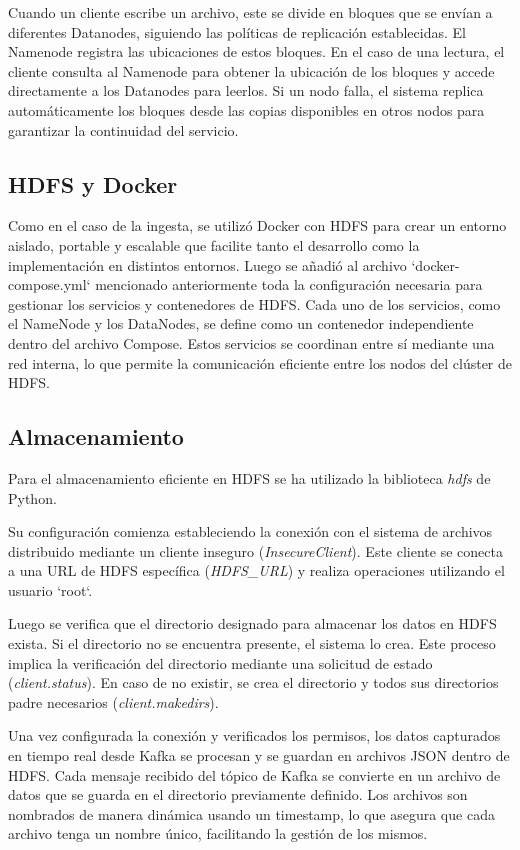 \documentclass{article}
\begin{document}
Cuando un cliente escribe un archivo, este se divide en bloques que se envían a diferentes Datanodes, siguiendo las políticas de replicación establecidas. El Namenode registra las ubicaciones de estos bloques. En el caso de una lectura, el cliente consulta al Namenode para obtener la ubicación de los bloques y accede directamente a los Datanodes para leerlos. Si un nodo falla, el sistema replica automáticamente los bloques desde las copias disponibles en otros nodos para garantizar la continuidad del servicio.

\subsection{HDFS y Docker}

Como en el caso de la ingesta, se utilizó Docker con HDFS para crear un entorno aislado, portable y escalable que facilite tanto el desarrollo como la implementación en distintos entornos.
Luego se añadió al archivo `docker-compose.yml` mencionado anteriormente toda la configuración necesaria para gestionar los servicios y contenedores de HDFS.
Cada uno de los servicios, como el NameNode y los DataNodes, se define como un contenedor independiente dentro del archivo Compose. Estos servicios se coordinan entre sí mediante una red interna, lo que permite la comunicación eficiente entre los nodos del clúster de HDFS.

\subsection{Almacenamiento}

Para el almacenamiento eficiente en HDFS se ha utilizado la biblioteca \textit{hdfs} de Python.

Su configuración comienza estableciendo la conexión con el sistema de archivos distribuido mediante un cliente inseguro (\textit{InsecureClient}). Este cliente se conecta a una URL de HDFS específica (\textit{HDFS\_URL}) y realiza operaciones utilizando el usuario `root`.

Luego se verifica que el directorio designado para almacenar los datos en HDFS exista. Si el directorio no se encuentra presente, el sistema lo crea. Este proceso implica la verificación del directorio mediante una solicitud de estado (\textit{client.status}). En caso de no existir, se crea el directorio y todos sus directorios padre necesarios (\textit{client.makedirs}).

Una vez configurada la conexión y verificados los permisos, los datos capturados en tiempo real desde Kafka se procesan y se guardan en archivos JSON dentro de HDFS. Cada mensaje recibido del tópico de Kafka se convierte en un archivo de datos que se guarda en el directorio previamente definido. Los archivos son nombrados de manera dinámica usando un timestamp, lo que asegura que cada archivo tenga un nombre único, facilitando la gestión de los mismos.
\end{document}
